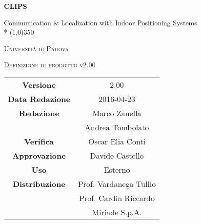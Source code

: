 \documentclass[a4paper,12pt]{article}
\author{}
\date{03/03/2016}
\begin{document}
\begin{titlepage}
	\centering
	{\huge\bfseries CLIPS\par}
	Communication \& Localization with Indoor Positioning Systems \\*
	\line(1,0){350} \\
	{\scshape\LARGE Università di Padova \par}
	\vspace{1cm}
	{\scshape\Large Definizione di prodotto v2.00\par}
	\logo
	
	\vfill \vfill
		\begin{tabular}{c|c}
			{\hfill \textbf{Versione}} 			& 2.00				\\
			{\hfill\textbf{Data Redazione}} 	& 2016-04-23	\\
			{\hfill\textbf{Redazione}} 			& Marco Zanella \\
												& Andrea Tombolato \\
			{\hfill\textbf{Verifica}} 			& Oscar Elia Conti \\
			{\hfill\textbf{Approvazione}} 		& Davide Castello		\\ 
			{\hfill\textbf{Uso}} 				& Esterno			\\ 
			{\hfill\textbf{Distribuzione}} 		& Prof. Vardanega Tullio \\
												& Prof. Cardin Riccardo \\
												& Miriade S.p.A. \\
		\end{tabular}
	\end{titlepage}
	
	\newpage
	\pagestyle{myfront}
		
	\newpage
		\tableofcontents
	\newpage
		\listoffigures	
	\label{LastFrontPage}
	\newpage
	
	\pagestyle{mymain}
	
	\newpage
		
		
	\newpage
		
		
	\newpage
		
		
	\newpage
			
		
	\newpage
		
		
	\newpage
		
		
	\newpage
		
	
	\newpage
		
		
		
		
	\label{LastPage}
\end{document}
